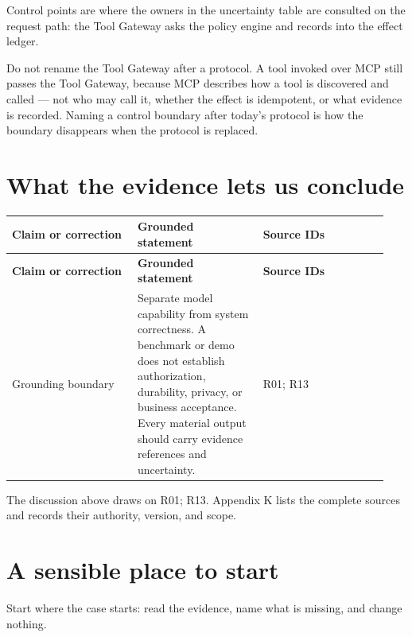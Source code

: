 Control points are where the owners in the uncertainty table are consulted on the request path: the Tool Gateway asks the policy engine and records into the effect ledger.\par

\begin{bookarchitecture}
Do not rename the Tool Gateway after a protocol. A tool invoked over MCP still passes the Tool Gateway, because MCP describes how a tool is discovered and called — not who may call it, whether the effect is idempotent, or what evidence is recorded. Naming a control boundary after today's protocol is how the boundary disappears when the protocol is replaced.
\end{bookarchitecture}

\section{What the evidence lets us conclude}

\BookTableStart
\small
\begin{longtable}{@{}Y{0.3133\linewidth}Y{0.3133\linewidth}Y{0.3133\linewidth}@{}}
\color{white}\bfseries \textbf{Claim or correction} & \color{white}\bfseries \textbf{Grounded statement} & \color{white}\bfseries \textbf{Source IDs} \\
\endfirsthead
{}
\color{white}\bfseries \textbf{Claim or correction} & \color{white}\bfseries \textbf{Grounded statement} & \color{white}\bfseries \textbf{Source IDs} \\
\endhead
Grounding boundary & Separate model capability from system correctness. A benchmark or demo does not establish authorization, durability, privacy, or business acceptance. Every material output should carry evidence references and uncertainty. & R01; R13 \\
\end{longtable}
\BookTableEnd

The discussion above draws on R01; R13. Appendix K lists the complete sources and records their authority, version, and scope.\par

\section{A sensible place to start}

Start where the case starts: read the evidence, name what is missing, and change nothing.\par

